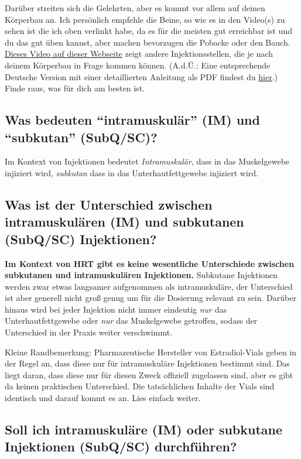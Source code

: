 \documentclass{article}
\begin{document}
Darüber streiten sich die Gelehrten, aber es kommt vor allem auf deinen Körperbau an. Ich persönlich empfehle die Beine, so wie es in den Video(s) zu sehen ist die ich oben verlinkt habe, da es für die meisten gut erreichbar ist und du das gut üben kannst, aber machen bevorzugen die Pobacke oder den Bauch. \href{https://vertisis.com/articles/how-to-self-administer-a-subcutaneous-injection}{Dieses Video auf dieser Webseite} zeigt andere Injektionsstellen, die je nach deinem Körperbau in Frage kommen können. (A.d.Ü.: Eine entsprechende Deutsche Version mit einer detaillierten Anleitung als PDF findest du \href{https://www.bk-trier.de/media-bkt/docs/PIZ_HZ_Subkutane_Injektion_2021.pdf}{hier}.) Finde raus, was für dich am besten ist.

\subsection{Was bedeuten “intramuskulär” (IM) und “subkutan” (SubQ/SC)?}

Im Kontext von Injektionen bedeutet \textit{Intramuskulär}, dass in das Muskelgewebe injiziert wird, \textit{subkutan} dass in das Unterhautfettgewebe injiziert wird.

\subsection{Was ist der Unterschied zwischen intramuskulären (IM) und subkutanen (SubQ/SC) Injektionen?}

\textbf{Im Kontext von HRT gibt es keine wesentliche Unterschiede zwischen subkutanen und intramuskulären Injektionen.} Subkutane Injektionen werden zwar etwas langsamer aufgenommen als intramuskuläre, der Unterschied ist aber generell nicht groß genug um für die Dosierung relevant zu sein. Darüber hinaus wird bei jeder Injektion nicht immer eindeutig \textit{nur } das Unterhautfettgewebe oder \textit{nur } das Muskelgewebe getroffen, sodass der Unterschied in der Praxis weiter verschwimmt.

Kleine Randbemerkung: Pharmazeutische Hersteller von Estradiol-Vials geben in der Regel an, dass diese nur für intramuskuläre Injektionen bestimmt sind. Das liegt daran, dass diese nur für diesen Zweck offiziell zugelassen sind, aber es gibt da keinen praktischen Unterschied. Die tatsächlichen Inhalte der Vials sind identisch und darauf kommt es an. Lies einfach weiter.

\subsection{Soll ich intramuskuläre (IM) oder subkutane Injektionen (SubQ/SC) durchführen?}
\end{document}
